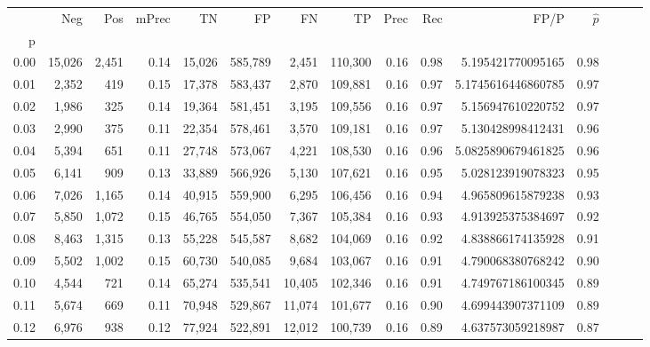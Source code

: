 \begin{tabular}{rrrrrrrrrrrrrrr}
\toprule
{} &     Neg &    Pos & mPrec &       TN &       FP &       FN &       TP &  Prec &   Rec &                 FP/P & $\hat{p}$ \\
p    &         &        &       &          &          &          &          &       &       &                      &           \\
\midrule
0.00 &  15,026 &  2,451 &  0.14 &   15,026 &  585,789 &    2,451 &  110,300 &  0.16 &  0.98 &    5.195421770095165 &      0.98 \\
0.01 &   2,352 &    419 &  0.15 &   17,378 &  583,437 &    2,870 &  109,881 &  0.16 &  0.97 &   5.1745616446860785 &      0.97 \\
0.02 &   1,986 &    325 &  0.14 &   19,364 &  581,451 &    3,195 &  109,556 &  0.16 &  0.97 &    5.156947610220752 &      0.97 \\
0.03 &   2,990 &    375 &  0.11 &   22,354 &  578,461 &    3,570 &  109,181 &  0.16 &  0.97 &    5.130428998412431 &      0.96 \\
0.04 &   5,394 &    651 &  0.11 &   27,748 &  573,067 &    4,221 &  108,530 &  0.16 &  0.96 &   5.0825890679461825 &      0.96 \\
0.05 &   6,141 &    909 &  0.13 &   33,889 &  566,926 &    5,130 &  107,621 &  0.16 &  0.95 &    5.028123919078323 &      0.95 \\
0.06 &   7,026 &  1,165 &  0.14 &   40,915 &  559,900 &    6,295 &  106,456 &  0.16 &  0.94 &    4.965809615879238 &      0.93 \\
0.07 &   5,850 &  1,072 &  0.15 &   46,765 &  554,050 &    7,367 &  105,384 &  0.16 &  0.93 &    4.913925375384697 &      0.92 \\
0.08 &   8,463 &  1,315 &  0.13 &   55,228 &  545,587 &    8,682 &  104,069 &  0.16 &  0.92 &    4.838866174135928 &      0.91 \\
0.09 &   5,502 &  1,002 &  0.15 &   60,730 &  540,085 &    9,684 &  103,067 &  0.16 &  0.91 &    4.790068380768242 &      0.90 \\
0.10 &   4,544 &    721 &  0.14 &   65,274 &  535,541 &   10,405 &  102,346 &  0.16 &  0.91 &    4.749767186100345 &      0.89 \\
0.11 &   5,674 &    669 &  0.11 &   70,948 &  529,867 &   11,074 &  101,677 &  0.16 &  0.90 &    4.699443907371109 &      0.89 \\
0.12 &   6,976 &    938 &  0.12 &   77,924 &  522,891 &   12,012 &  100,739 &  0.16 &  0.89 &    4.637573059218987 &      0.87 \\

\end{tabular}
